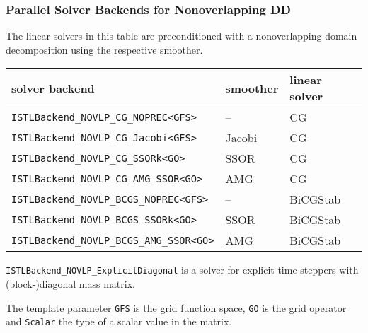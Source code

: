 \begin{frame}
  \frametitle{Parallel Solver Backends for Nonoverlapping DD}
The linear solvers in this table are preconditioned with a nonoverlapping domain decomposition
using the respective smoother.
\begin{center}
\begin{tabular}{|l|l|l|}\hline
solver backend & smoother & linear solver\\\hline
\lstinline!ISTLBackend_NOVLP_CG_NOPREC<GFS>! & -- & CG\\\hline
\lstinline!ISTLBackend_NOVLP_CG_Jacobi<GFS>! & Jacobi & CG\\\hline
\lstinline!ISTLBackend_NOVLP_CG_SSORk<GO>! & SSOR & CG\\\hline
\lstinline!ISTLBackend_NOVLP_CG_AMG_SSOR<GO>! & AMG & CG\\\hline
\lstinline!ISTLBackend_NOVLP_BCGS_NOPREC<GFS>! & -- & BiCGStab\\\hline
\lstinline!ISTLBackend_NOVLP_BCGS_SSORk<GO>! & SSOR & BiCGStab\\\hline
\lstinline!ISTLBackend_NOVLP_BCGS_AMG_SSOR<GO>! & AMG & BiCGStab\\\hline
\end{tabular}
\end{center}
\lstinline!ISTLBackend_NOVLP_ExplicitDiagonal! is a solver for explicit
time-steppers with (block-)diagonal mass matrix.

The template parameter \lstinline!GFS! is the grid function space, \lstinline!GO! is the grid operator
and \lstinline!Scalar! the type of a scalar value in the matrix.
\end{frame}

